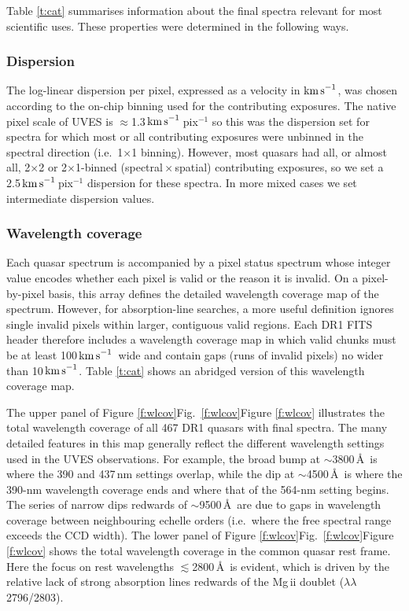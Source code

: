 \documentclass[fleqn,usenatbib,usedcolumn]{mnras}
\renewcommand{\la}{\lesssim} %
\newcommand{\Tref}[1]{Table \ref{#1}}
\newcommand{\Fref}[1]{\ifhmode \ifnum\spacefactor=1001 Figure \ref{#1}\else Fig.\ \ref{#1}\fi \else Figure \ref{#1}\fi}
\newcommand{\kms}{\ensuremath{\textrm{km\,s}^{-1}}}
\begin{document}
\Tref{t:cat} summarises information about the final spectra relevant for most scientific uses. These properties were determined in the following ways.

\subsubsection{Dispersion}\label{sss:dispersion}

The log-linear dispersion per pixel, expressed as a velocity in \kms, was chosen according to the on-chip binning used for the contributing exposures. The native pixel scale of UVES is $\approx$1.3\,\kms\,pix$^{-1}$ so this was the dispersion set for spectra for which most or all contributing exposures were unbinned in the spectral direction (i.e.\ 1$\times$1 binning). However, most quasars had all, or almost all, 2$\times$2 or 2$\times$1-binned (spectral\,$\times$\,spatial) contributing exposures, so we set a 2.5\,\kms\,pix$^{-1}$ dispersion for these spectra. In more mixed cases we set intermediate dispersion values.

\subsubsection{Wavelength coverage}\label{sss:coverage}

Each quasar spectrum is accompanied by a pixel status spectrum whose integer value encodes whether each pixel is valid or the reason it is invalid. On a pixel-by-pixel basis, this array defines the detailed wavelength coverage map of the spectrum. However, for absorption-line searches, a more useful definition ignores single invalid pixels within larger, contiguous valid regions. Each DR1 FITS header therefore includes a wavelength coverage map in which valid chunks must be at least 100\,\kms\ wide and contain gaps (runs of invalid pixels) no wider than 10\,\kms. \Tref{t:cat} shows an abridged version of this wavelength coverage map.

The upper panel of \Fref{f:wlcov} illustrates the total wavelength coverage of all 467 DR1 quasars with final spectra. The many detailed features in this map generally reflect the different wavelength settings used in the UVES observations. For example, the broad bump at $\sim$3800\,\AA\ is where the 390 and 437\,nm settings overlap, while the dip at $\sim$4500\,\AA\ is where the 390-nm wavelength coverage ends and where that of the 564-nm setting begins. The series of narrow dips redwards of $\sim$9500\,\AA\ are due to gaps in wavelength coverage between neighbouring echelle orders (i.e.\ where the free spectral range exceeds the CCD width). The lower panel of \Fref{f:wlcov} shows the total wavelength coverage in the common quasar rest frame. Here the focus on rest wavelengths $\la$2800\,\AA\ is evident, which is driven by the relative lack of strong absorption lines redwards of the Mg{\sc \,ii} doublet ($\lambda\lambda$2796/2803).
\end{document}
